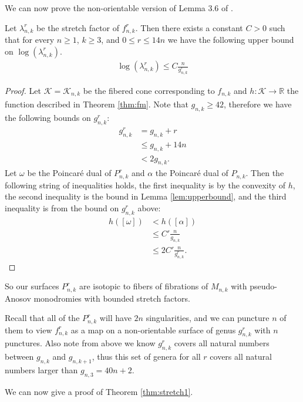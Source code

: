 We can now prove the non-orientable version of Lemma 3.6 of \cite{yazdi2018pseudo}.
\begin{lem}
\label{lem:bound}
Let $\lambda_{n,k}^r$ be the stretch factor of $f_{n,k}^r$. Then there exists a constant $C > 0$ such that for every $n \geq 1$, $k \geq 3$, and $0 \leq r \leq 14n$ we have the following upper bound on $\log(\lambda_{n,k}^r)$.
\begin{align*}
  \log(\lambda^r_{n,k}) \leq C\frac{n}{g^r_{n,k}}
\end{align*}
\end{lem}
\begin{proof}
  Let $\mathcal{K} = \mathcal{K}_{n,k}$ be the fibered cone corresponding to $f_{n,k}$ and $h: \mathcal{K} \xrightarrow[]{} \mathbb{R}$
  the function described in Theorem \ref{thm:fm}. Note that $g_{n,k}\geq 42$, therefore we have the following bounds on $g_{n,k}^r$:
  \begin{align*}
    g^r_{n,k} &= g_{n,k} + r \\
              &\leq g_{n,k} + 14n \\
              &< 2g_{n,k}.
  \end{align*}
  Let $\omega$ be the Poincar\'e dual of $P^r_{n,k}$ and $\alpha$ the Poincar\'e dual of $P_{n,k}$.  Then the following string of inequalities holds, the first inequality is by the convexity of $h$, the second inequality is the bound in Lemma \ref{lem:upperbound}, and the third inequality is from the bound on $g^r_{n,k}$ above:
  \begin{align*}
    h([\omega]) &< h([\alpha]) \\
                &\leq C'\frac{n}{g_{n,k}} \\
                &\leq 2C'\frac{n}{g^r_{n,k}}. 
  \end{align*}
\end{proof}

So  our surfaces $P^r_{n,k}$ are isotopic to fibers of fibrations of $M_{n,k}$ with
pseudo-Anosov monodromies with bounded stretch factors.

Recall that all of the $P^r_{n,k}$ will have $2n$ singularities, and we can puncture $n$ of them to view $f^r_{n,k}$ as a map on a non-orientable surface of genus $g^r_{n,k}$ with $n$ punctures. Also note from above we
know $g^r_{n,k}$ covers all natural numbers between $g_{n,k}$ and $g_{n,k+1}$, thus this set of genera
for all $r$ covers all natural numbers larger than $g_{n,3} = 40n + 2$. 

We can now give a proof of Theorem \ref{thm:stretch1}.

